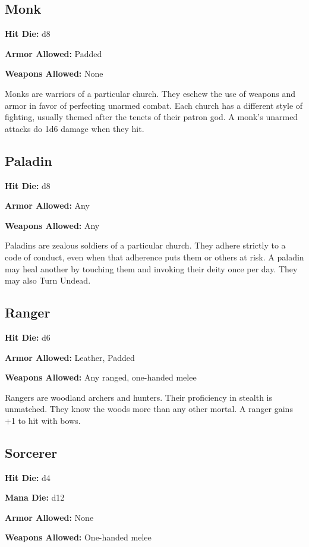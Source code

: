 \begin{multicols}{2}
\subsection{Monk}

\textbf{Hit Die:} d8

\textbf{Armor Allowed:} Padded

\textbf{Weapons Allowed:} None

Monks are warriors of a particular church. They eschew the use of weapons and
armor in favor of perfecting unarmed combat. Each church has a different style
of fighting, usually themed after the tenets of their patron god. A monk's
unarmed attacks do 1d6 damage when they hit.

\subsection{Paladin}

\textbf{Hit Die:} d8

\textbf{Armor Allowed:} Any

\textbf{Weapons Allowed:} Any

Paladins are zealous soldiers of a particular church. They adhere strictly to
a code of conduct, even when that adherence puts them or others at risk. A
paladin may heal another by touching them and invoking their deity once per day.
They may also Turn Undead.

\subsection{Ranger}

\textbf{Hit Die:} d6

\textbf{Armor Allowed:} Leather, Padded

\textbf{Weapons Allowed:} Any ranged, one-handed melee

Rangers are woodland archers and hunters. Their proficiency in stealth is
unmatched. They know the woods more than any other mortal. A ranger gains +1 to
hit with bows.

\subsection{Sorcerer}

\textbf{Hit Die:} d4

\textbf{Mana Die:} d12

\textbf{Armor Allowed:} None

\textbf{Weapons Allowed:} One-handed melee


\end{multicols}

